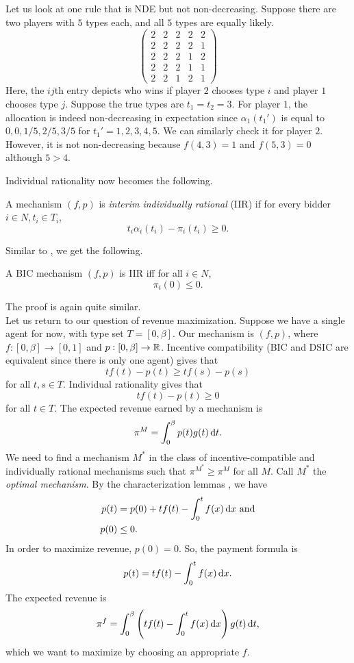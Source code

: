 		\begin{fex}
			Let us look at one rule that is NDE but not non-decreasing. Suppose there are two players with $5$ types each, and all $5$ types are equally likely.
			\[
			\begin{pmatrix}
				2 & 2 & 2 & 2 & 2 \\
				2 & 2 & 2 & 2 & 1 \\
				2 & 2 & 2 & 1 & 2 \\
				2 & 2 & 2 & 1 & 1 \\
				2 & 2 & 1 & 2 & 1
			\end{pmatrix}
			\]
			Here, the $ij$th entry depicts who wins if player $2$ chooses type $i$ and player $1$ chooses type $j$. Suppose the true types are $t_1 = t_2 = 3$. For player $1$, the allocation is indeed non-decreasing in expectation since $\alpha_1(t_1')$ is equal to $0,0,1/5,2/5,3/5$ for $t_1' = 1,2,3,4,5$. We can similarly check it for player $2$. However, it is not non-decreasing because $f(4,3) = 1$ and $f(5,3) = 0$ although $5 > 4$.
		\end{fex}

		Individual rationality now becomes the following.
		\begin{fdef}
			A mechanism $(f,p)$ is \emph{interim individually rational} (IIR) if for every bidder $i \in N, t_i \in T_i$,
			\[ t_i \alpha_i(t_i) - \pi_i(t_i) \ge 0. \]
		\end{fdef}

		Similar to , we get the following.
		\begin{flem}
			\label{bic iir}
			A BIC mechanism $(f,p)$ is IIR iff for all $i \in N$,
			\[ \pi_i(0) \le 0. \]
		\end{flem}
		The proof is again quite similar.\\

		Let us return to our question of revenue maximization. Suppose we have a single agent for now, with type set $T = [0,\beta]$. Our mechanism is $(f,p)$, where $f : [0,\beta] \to [0,1]$ and $p : [0,\beta] \to \mathbb{R}$. Incentive compatibility (BIC and DSIC are equivalent since there is only one agent) gives that
		\[ tf(t) - p(t) \ge tf(s) - p(s) \]
		for all $t,s \in T$. Individual rationality gives that
		\[ tf(t) - p(t) \ge 0 \]
		for all $t \in T$. The expected revenue earned by a mechanism is
		\[ \pi^M = \int_0^\beta p(t) g(t) \dif t. \]
		We need to find a mechanism $M^*$ in the class of incentive-compatible and individually rational mechanisms such that $\pi^{M^*} \ge \pi^M$ for all $M$. Call $M^*$ the \emph{optimal mechanism}. By the characterization lemmas , we have
		\begin{align*}
			p(t) &= p(0) + tf(t) - \int_0^t f(x) \dif x \text{ and} \\
			p(0) &\le 0.
		\end{align*}
		In order to maximize revenue, $p(0) = 0$. So, the payment formula is
		\[ p(t) = tf(t) - \int_0^t f(x) \dif x. \]
		The expected revenue is
		\[ \pi^f = \int_0^\beta \left( tf(t) - \int_0^t f(x) \dif x \right) g(t) \dif t, \]
		which we want to maximize by choosing an appropriate $f$.

